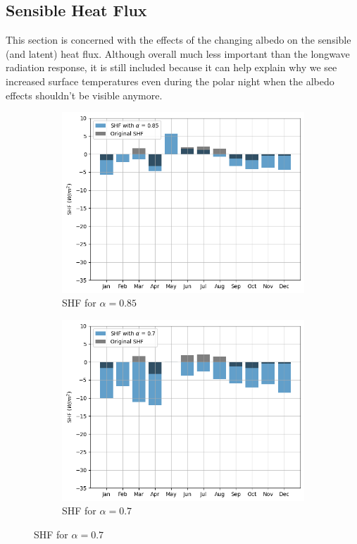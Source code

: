 \documentclass{article}
\begin{document}
\subsection*{Sensible Heat Flux}
This section is concerned with the effects of the changing albedo on the sensible (and latent) heat flux. 
Although overall much less important than the longwave radiation response, it is still included because it can help explain why we see increased surface temperatures even during the polar night when the albedo effects shouldn't be visible anymore. 

\begin{figure}[h!]
  \centering
  \begin{subfigure}{0.49\textwidth}
      \centering
      \includegraphics[width=\linewidth]{figures/Bar_SHF_085.png}  %
      \caption{SHF for $\alpha = 0.85$}
      \label{fig:SHF085}
  \end{subfigure}
  \hfill
  \begin{subfigure}{0.49\textwidth}
      \centering
      \includegraphics[width=\linewidth]{figures/Bar_SHF_07.png}  %
      \caption{SHF for $\alpha = 0.7$}
      \label{fig:SHF07}
  \end{subfigure}
  

\end{figure}
\end{document}
